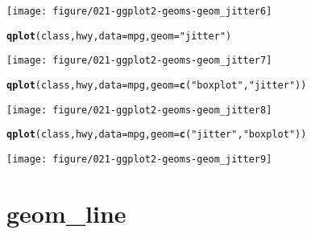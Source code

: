 \documentclass[a4paper,titlepage]{tufte-handout}\usepackage[]{graphicx}\usepackage[]{color}
\makeatletter
\def\maxwidth{ %
  \ifdim\Gin@nat@width>\linewidth
    \linewidth
  \else
    \Gin@nat@width
  \fi
}
\newcommand{\hlstr}[1]{\textcolor[rgb]{0.192,0.494,0.8}{#1}}%
\newcommand{\hlstd}[1]{\textcolor[rgb]{0.345,0.345,0.345}{#1}}%
\newcommand{\hlkwc}[1]{\textcolor[rgb]{0.333,0.667,0.333}{#1}}%
\newcommand{\hlkwd}[1]{\textcolor[rgb]{0.737,0.353,0.396}{\textbf{#1}}}%
\newenvironment{kframe}{%
 \def\at@end@of@kframe{}%
 \ifinner\ifhmode%
  \def\at@end@of@kframe{\end{minipage}}%
  \begin{minipage}{\columnwidth}%
 \fi\fi%
 \def\FrameCommand##1{\hskip\@totalleftmargin \hskip-\fboxsep
 \colorbox{shadecolor}{##1}\hskip-\fboxsep
     \hskip-\linewidth \hskip-\@totalleftmargin \hskip\columnwidth}%
 \MakeFramed {\advance\hsize-\width
   \@totalleftmargin\z@ \linewidth\hsize
   \@setminipage}}%
 {\par\unskip\endMakeFramed%
 \at@end@of@kframe}
\newenvironment{knitrout}{}{} %
\makeatother
\begin{document}
\begin{knitrout}
\begin{kframe}
\begin{alltt}
\end{alltt}
\end{kframe}
\texttt{[image: figure/021-ggplot2-geoms-geom\_jitter6]} 
\begin{kframe}\begin{alltt}
\hlkwd{qplot}\hlstd{(class, hwy,} \hlkwc{data} \hlstd{= mpg,} \hlkwc{geom} \hlstd{=} \hlstr{"jitter"}\hlstd{)}
\end{alltt}
\end{kframe}
\texttt{[image: figure/021-ggplot2-geoms-geom\_jitter7]} 
\begin{kframe}\begin{alltt}
\hlkwd{qplot}\hlstd{(class, hwy,} \hlkwc{data} \hlstd{= mpg,} \hlkwc{geom} \hlstd{=} \hlkwd{c}\hlstd{(}\hlstr{"boxplot"}\hlstd{,} \hlstr{"jitter"}\hlstd{))}
\end{alltt}
\end{kframe}
\texttt{[image: figure/021-ggplot2-geoms-geom\_jitter8]} 
\begin{kframe}\begin{alltt}
\hlkwd{qplot}\hlstd{(class, hwy,} \hlkwc{data} \hlstd{= mpg,} \hlkwc{geom} \hlstd{=} \hlkwd{c}\hlstd{(}\hlstr{"jitter"}\hlstd{,} \hlstr{"boxplot"}\hlstd{))}
\end{alltt}
\end{kframe}
\texttt{[image: figure/021-ggplot2-geoms-geom\_jitter9]} 
\begin{kframe}\begin{alltt}


\end{alltt}
\end{kframe}
\end{knitrout}



\section{geom\_line}
\end{document}
